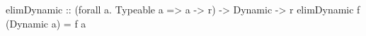 \begin{code}
elimDynamic
    :: (forall a. Typeable a => a -> r)
    -> Dynamic
    -> r
elimDynamic f (Dynamic a) = f a
\end{code}
